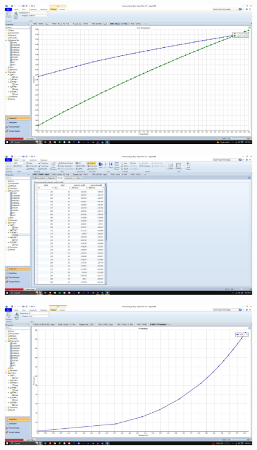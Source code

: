\documentclass{article}
\begin{document}
\begin{figure}[H]
    \centering
    \includegraphics[width=0.99\textwidth, frame]{img/10 (G20bar).JPG}
\end{figure}

\begin{figure}[H]
    \centering
    \includegraphics[width=0.99\textwidth, frame]{img/11 (G20bar table).JPG}
\end{figure}

\begin{figure}[H]
    \centering
    \includegraphics[width=0.99\textwidth, frame]{img/12 (pt envelope).JPG}
\end{figure}
\end{document}
